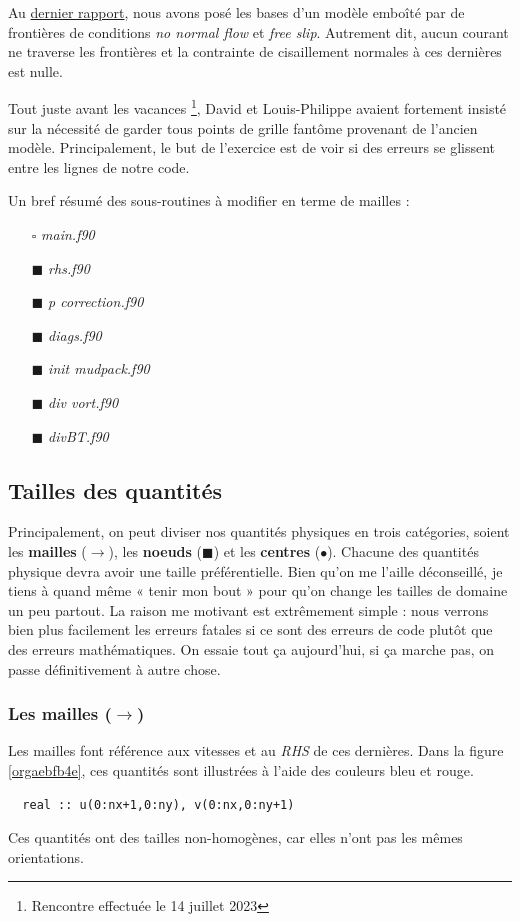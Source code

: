 \documentclass[10pt]{article}
\numberwithin{equation}{section}
\renewcommand{\boxtimes}{\blacksquare}
\begin{document}
Au \href{rapport-2023-07-07.org}{dernier rapport}, nous avons posé les bases d'un modèle emboîté par de frontières de conditions \emph{no normal flow} et \emph{free slip}.
Autrement dit, aucun courant ne traverse les frontières et la contrainte de cisaillement normales à ces dernières est nulle. \bigskip

Tout juste avant les vacances \footnote{Rencontre effectuée le 14 juillet 2023}, David et Louis-Philippe avaient fortement insisté sur la nécessité de garder tous points de grille fantôme provenant de l'ancien modèle.
Principalement, le but de l'exercice est de voir si des erreurs se glissent entre les lignes de notre code. \bigskip

Un bref résumé des sous-routines à modifier en terme de mailles : 
\begin{itemize}
\item[{$\square$}] \emph{main.f90}
\item[{$\boxtimes$}] \emph{rhs.f90}
\item[{$\boxtimes$}] \emph{p correction.f90}
\item[{$\boxtimes$}] \emph{diags.f90}
\item[{$\boxtimes$}] \emph{init mudpack.f90}
\item[{$\boxtimes$}] \emph{div vort.f90}
\item[{$\boxtimes$}] \emph{divBT.f90}
\end{itemize}
\subsection{Tailles des quantités}
\label{sec:org32b20fc}
Principalement, on peut diviser nos quantités physiques en trois catégories, soient les \textbf{mailles} (\(\rightarrow\)), les \textbf{noeuds} (\(\blacksquare\)) et les \textbf{centres} (\(\bullet\)).
Chacune des quantités physique devra avoir une taille préférentielle.
Bien qu'on me l'aille déconseillé, je tiens à quand même « tenir mon bout » pour qu'on change les tailles de domaine un peu partout.
La raison me motivant est extrêmement simple : nous verrons bien plus facilement les erreurs fatales si ce sont des erreurs de code plutôt que des erreurs mathématiques.
On essaie tout ça aujourd'hui, si ça marche pas, on passe définitivement à autre chose.
\subsubsection{Les mailles (\(\rightarrow\))}
\label{sec:org1b58cf4}
Les mailles font référence aux vitesses et au \emph{RHS} de ces dernières. 
Dans la figure \ref{orgaebfb4e}, ces quantités sont illustrées à l'aide des couleurs bleu et rouge.
\begin{verbatim}
  real :: u(0:nx+1,0:ny), v(0:nx,0:ny+1)
\end{verbatim}
Ces quantités ont des tailles non-homogènes, car elles n'ont pas les mêmes orientations.
\end{document}
